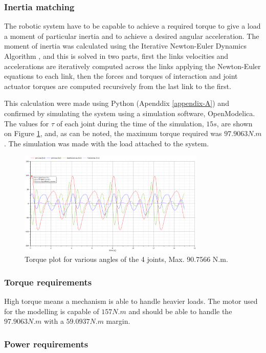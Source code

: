 \documentclass[transmag]{IEEEtran}
\begin{document}
\subsubsection{Inertia matching}

The robotic system have to be capable to achieve a required torque to give a load a moment of particular inertia and to achieve a desired angular acceleration. The moment of inertia was calculated using the Iterative Newton-Euler Dynamics Algorithm \cite{ref7}, and this is solved in two parts, first the links velocities and accelerations are iteratively computed across the links applying the Newton-Euler equations to each link, then the forces and torques of interaction and joint actuator torques are computed recursively from the last link to the first.

This calculation were made using Python (Apenddix \ref{appendix-A}) and confirmed by simulating the system using a simulation software, OpenModelica. The values for $\tau$ of each joint during the time of the simulation, $15 s$, are shown on Figure \ref{TauJoints}, and, as can be noted, the maximum torque required was $97.9063 N.m$. The simulation was made with the load attached to the system.

\begin{figure}
\centerline{\includegraphics[width=3.5in]{./images/TausJoints}}
\caption{Torque plot for various angles of the 4 joints, Max. 90.7566 N.m.\label{TauJoints}}
\end{figure}

\subsubsection{Torque requirements}

High torque means a mechanism is able to handle heavier loads. The motor used for the modelling is capable of $157 N.m$ and should be able to handle the $97.9063 N.m$ with a $59.0937 N.m$ margin.

\subsubsection{Power requirements}
\end{document}
